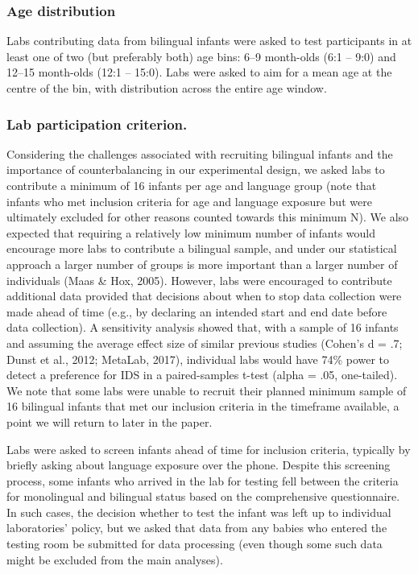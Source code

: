 \documentclass[,man,floatsintext]{apa6}
\begin{document}
\hypertarget{age-distribution}{%
\subsubsection{Age distribution}\label{age-distribution}}

Labs contributing data from bilingual infants were asked to test participants in at least one of two (but preferably both) age bins: 6--9 month-olds (6:1 -- 9:0) and 12--15 month-olds (12:1 -- 15:0). Labs were asked to aim for a mean age at the centre of the bin, with distribution across the entire age window.

\hypertarget{lab-participation-criterion.}{%
\subsubsection{Lab participation criterion.}\label{lab-participation-criterion.}}

Considering the challenges associated with recruiting bilingual infants and the importance of counterbalancing in our experimental design, we asked labs to contribute a minimum of 16 infants per age and language group (note that infants who met inclusion criteria for age and language exposure but were ultimately excluded for other reasons counted towards this minimum N). We also expected that requiring a relatively low minimum number of infants would encourage more labs to contribute a bilingual sample, and under our statistical approach a larger number of groups is more important than a larger number of individuals (Maas \& Hox, 2005). However, labs were encouraged to contribute additional data provided that decisions about when to stop data collection were made ahead of time (e.g., by declaring an intended start and end date before data collection). A sensitivity analysis showed that, with a sample of 16 infants and assuming the average effect size of similar previous studies (Cohen's d = .7; Dunst et al., 2012; MetaLab, 2017), individual labs would have 74\% power to detect a preference for IDS in a paired-samples t-test (alpha = .05, one-tailed). We note that some labs were unable to recruit their planned minimum sample of 16 bilingual infants that met our inclusion criteria in the timeframe available, a point we will return to later in the paper.

Labs were asked to screen infants ahead of time for inclusion criteria, typically by briefly asking about language exposure over the phone. Despite this screening process, some infants who arrived in the lab for testing fell between the criteria for monolingual and bilingual status based on the comprehensive questionnaire. In such cases, the decision whether to test the infant was left up to individual laboratories' policy, but we asked that data from any babies who entered the testing room be submitted for data processing (even though some such data might be excluded from the main analyses).
\end{document}
